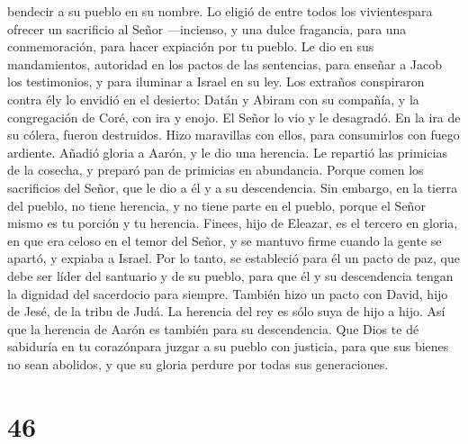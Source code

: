 bendecir a su pueblo en su nombre.  Lo eligió de entre
todos los vivientespara ofrecer un sacrificio al Señor ---incienso, y
una dulce fragancia, para una conmemoración, para hacer expiación por tu
pueblo.  Le dio en sus mandamientos, autoridad en los
pactos de las sentencias, para enseñar a Jacob los testimonios, y para
iluminar a Israel en su ley.  Los extraños conspiraron
contra ély lo envidió en el desierto: Datán y Abiram con su compañía, y
la congregación de Coré, con ira y enojo.  El Señor lo
vio y le desagradó. En la ira de su cólera, fueron destruidos. Hizo
maravillas con ellos, para consumirlos con fuego ardiente.
 Añadió gloria a Aarón, y le dio una herencia. Le
repartió las primicias de la cosecha, y preparó pan de primicias en
abundancia.  Porque comen los sacrificios del Señor, que
le dio a él y a su descendencia.  Sin embargo, en la
tierra del pueblo, no tiene herencia, y no tiene parte en el pueblo,
porque el Señor mismo es tu porción y tu herencia. 
Finees, hijo de Eleazar, es el tercero en gloria, en que era celoso en
el temor del Señor, y se mantuvo firme cuando la gente se apartó, y
expiaba a Israel.  Por lo tanto, se estableció para él un
pacto de paz, que debe ser líder del santuario y de su pueblo, para que
él y su descendencia tengan la dignidad del sacerdocio para siempre.
 También hizo un pacto con David, hijo de Jesé, de la
tribu de Judá. La herencia del rey es sólo suya de hijo a hijo. Así que
la herencia de Aarón es también para su descendencia. 
Que Dios te dé sabiduría en tu corazónpara juzgar a su pueblo con
justicia, para que sus bienes no sean abolidos, y que su gloria perdure
por todas sus generaciones.

\hypertarget{section-45}{%
\section{46}\label{section-45}}

